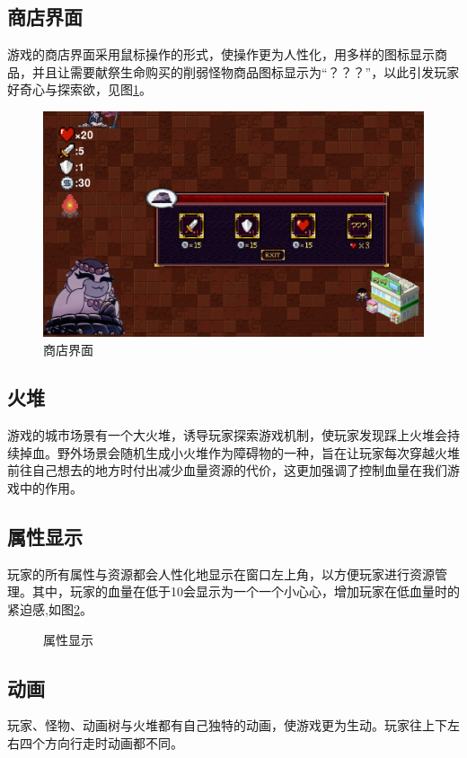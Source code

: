 \documentclass{ctexart}
\begin{document}
\subsection{商店界面}
游戏的商店界面采用鼠标操作的形式，使操作更为人性化，用多样的图标显示商品，并且让需要献祭生命购买的削弱怪物商品图标显示为“？？？”，以此引发玩家好奇心与探索欲，见图\ref{fig:商店}。
\begin{figure}[h]
\centering
\includegraphics[width=0.75\linewidth]{商店.png}
\caption{\label{fig:商店}商店界面}
\end{figure}

\subsection{火堆}
游戏的城市场景有一个大火堆，诱导玩家探索游戏机制，使玩家发现踩上火堆会持续掉血。野外场景会随机生成小火堆作为障碍物的一种，旨在让玩家每次穿越火堆前往自己想去的地方时付出减少血量资源的代价，这更加强调了控制血量在我们游戏中的作用。

\subsection{属性显示}
玩家的所有属性与资源都会人性化地显示在窗口左上角，以方便玩家进行资源管理。其中，玩家的血量在低于10会显示为一个一个小心心，增加玩家在低血量时的紧迫感,如图\ref{fig:属性显示}。
\begin{figure}[h]
\centering
{}
\caption{\label{fig:属性显示}属性显示}
\end{figure}

\subsection{动画}
玩家、怪物、动画树与火堆都有自己独特的动画，使游戏更为生动。玩家往上下左右四个方向行走时动画都不同。
\end{document}
